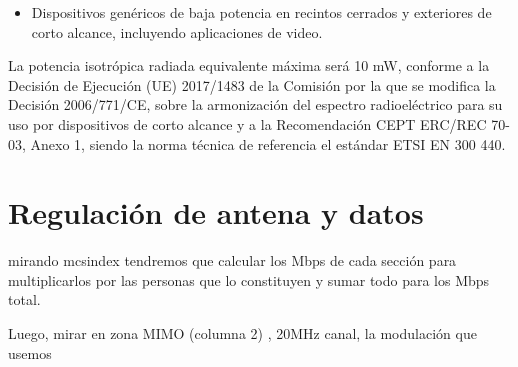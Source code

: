 \documentclass{article}
\begin{document}
\begin{itemize}
    \item Dispositivos genéricos de baja potencia en recintos cerrados y exteriores
    de corto alcance, incluyendo aplicaciones de video.
\end{itemize}
    La potencia isotrópica radiada equivalente máxima será 10 mW, conforme a la
    Decisión de Ejecución (UE) 2017/1483 de la Comisión por la que se modifica la
    Decisión 2006/771/CE, sobre la armonización del espectro radioeléctrico para su uso
    por dispositivos de corto alcance y a la Recomendación CEPT ERC/REC 70-03,
    Anexo 1, siendo la norma técnica de referencia el estándar ETSI EN 300 440. 


\section{Regulación de antena y datos}

mirando mcsindex tendremos que calcular los Mbps de cada sección para multiplicarlos por las personas que lo constituyen y sumar todo para los Mbps total. 

Luego, mirar en zona MIMO (columna 2) , 20MHz canal, la modulación que usemos
\end{document}

